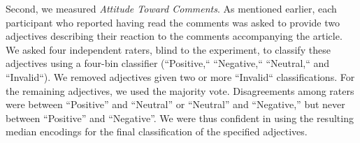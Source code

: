 
Second, we measured {\it Attitude Toward Comments}.  As mentioned earlier, each participant who reported having read the comments was asked to provide two adjectives describing their reaction to the comments accompanying the article.
We asked four independent raters, blind to the experiment, to classify these adjectives using a four-bin classifier (``Positive,`` ``Negative,`` ``Neutral,`` and ``Invalid``). %
We removed adjectives given two or more ``Invalid`` classifications.%
For the remaining adjectives, we used the majority vote.  Disagreements among raters were between ``Positive'' and ``Neutral'' or ``Neutral'' and ``Negative,'' but never between ``Positive'' and ``Negative''.  
We were thus confident in using the resulting median encodings for the final classification of the specified adjectives. 


